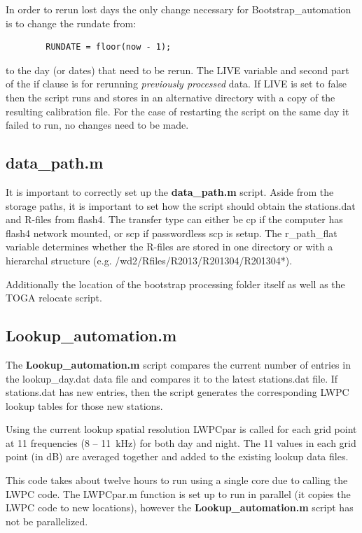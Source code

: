 In order to rerun lost days the only change necessary for Bootstrap\_automation is to change the rundate from:

\begin{verbatim}
		RUNDATE = floor(now - 1);
\end{verbatim}

to the day (or dates) that need to be rerun.
The LIVE variable and second part of the if clause is for rerunning \emph{previously processed} data.
If LIVE is set to false then the script runs and stores in an alternative directory with a copy of the resulting calibration file.
For the case of restarting the script on the same day it failed to run, no changes need to be made.

\subsection{data\_path.m}

It is important to correctly set up the {\bf data\_path.m} script. 
Aside from the storage paths, it is important to set how the script should obtain the stations.dat and R-files from flash4.
The transfer type can either be cp if the computer has flash4 network mounted, or scp if passwordless scp is setup.
The r\_path\_flat variable determines whether the R-files are stored in one directory or with a hierarchal structure (e.g. /wd2/Rfiles/R2013/R201304/R201304*).

Additionally the location of the bootstrap processing folder itself as well as the TOGA relocate script.

\subsection{Lookup\_automation.m}

The {\bf Lookup\_automation.m} script compares the current number of entries in the lookup\_day.dat data file and compares it to the latest stations.dat file.
If stations.dat has new entries, then the script generates the corresponding LWPC lookup tables for those new stations.

Using the current lookup spatial resolution LWPCpar is called for each grid point at 11 frequencies (8 -- 11~kHz) for both day and night.
The 11 values in each grid point (in dB) are averaged together and added to the existing lookup data files.

This code takes about twelve hours to run using a single core due to calling the LWPC code.
The LWPCpar.m function is set up to run in parallel (it copies the LWPC code to new locations), however the {\bf Lookup\_automation.m} script has not be parallelized.

